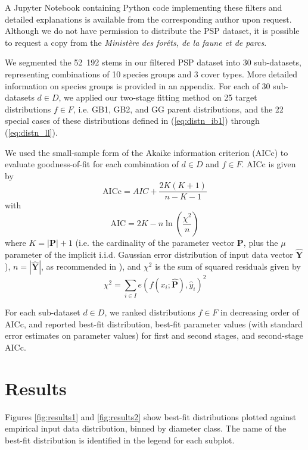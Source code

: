 \documentclass{article}
\begin{document}
A Jupyter Notebook containing Python code implementing these filters and detailed explanations is available from the corresponding author upon request.
Although we do not have permission to distribute the PSP dataset, it is possible to request a copy from the \emph{Ministère des forêts, de la faune et de parcs}.

We segmented the 52~192 stems in our filtered PSP dataset into 30 sub-datasets, representing combinations of 10 species groups and 3 cover types.
More detailed information on species groups is provided in an appendix. 
For each of 30 sub-datasets $d \in D$, we applied our two-stage fitting method on 25 target distributions $f \in F$, i.e. GB1, GB2, and GG parent distributions, and the 22 special cases of these distributions defined in (\ref{eq:distn_ib1}) through (\ref{eq:distn_ll}).

We used the small-sample form of the Akaike information criterion (AICc) to evaluate goodness-of-fit for each combination of $d \in D$ and $f \in F$. AICc is given by
\begin{equation}
\text{AICc} = AIC + \frac{2K(K + 1)}{n - K - 1}
\end{equation}
with 
\begin{equation}
\text{AIC} = 2K - n\ln\left(\frac{\chi^2}{n}\right)
\end{equation}
where $K=|\mathbf{P}|+1$ (i.e. the cardinality of the parameter vector $\mathbf{P}$, plus the $\mu$ parameter of the implicit i.i.d. Gaussian error distribution of input data vector $\mathbf{\hat{Y}}$), $n=|\mathbf{\hat{Y}}|$, as recommended in \citealp{burnham2002model}), and $\chi^2$ is the sum of squared residuals given by
\begin{equation}
\chi^2 = \sum_{i \in I} e\left(f(x_i; \bm{\hat{P}}), \hat{y}_i\right)^2
\end{equation}

For each sub-dataset $d \in D$, we ranked distributions $f \in F$ in decreasing order of AICc, and reported best-fit distribution, best-fit parameter values (with standard error estimates on parameter values) for first and second stages, and second-stage AICc.

\section{Results}
\label{sec:results}

Figures \ref{fig:results1} and \ref{fig:results2} show best-fit distributions plotted against empirical input data distribution, binned by diameter class. The name of the best-fit distribution is identified in the legend for each subplot.
\end{document}
